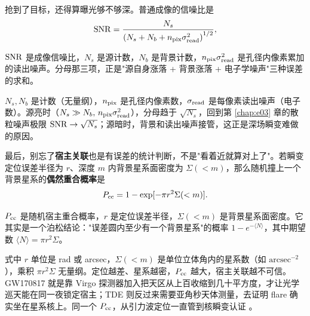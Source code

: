 抢到了目标，还得算曝光够不够深。普通成像的信噪比是
\begin{equation}
  {\rm SNR}=
  \frac{N_s}
  {\left(N_s+N_b+n_{\rm pix}\sigma_{\rm read}^2\right)^{1/2}},
  \label{eq:e20-imaging-snr}
\end{equation}
\begin{formulaexplain}
\({\rm SNR}\) 是成像信噪比，\(N_s\) 是源计数，\(N_b\) 是背景计数，\(n_{\rm pix}\sigma_{\rm read}^2\) 是孔径内像素累加的读出噪声。分母那三项，正是"源自身涨落 + 背景涨落 + 电子学噪声"三种误差的求和。
\end{formulaexplain}
\(N_s,N_b\) 是计数（无量纲），\(n_{\rm pix}\) 是孔径内像素数，\(\sigma_{\rm read}\) 是每像素读出噪声（电子数）。源亮时（\(N_s\gg N_b,\,n_{\rm pix}\sigma_{\rm read}^2\)），分母趋于 \(\sqrt{N_s}\)，回到第 \ref{chap:e03} 章的散粒噪声极限 \({\rm SNR}\to\sqrt{N_s}\)；源暗时，背景和读出噪声接管，这正是深场瞬变难做的原因。

最后，别忘了\textbf{宿主关联}也是有误差的统计判断，不是"看着近就算对上了"。若瞬变定位误差半径为 \(r\)、深度 \(m\) 内背景星系面密度为 \(\Sigma(<m)\)，那么随机撞上一个背景星系的\textbf{偶然重合概率}是
\begin{equation}
  P_{\rm cc}=1-\exp[-\pi r^2\Sigma(<m)].
  \label{eq:e20-chance-coincidence}
\end{equation}
\begin{formulaexplain}
\(P_{\rm cc}\) 是随机宿主重合概率，\(r\) 是定位误差半径，\(\Sigma(<m)\) 是背景星系面密度。它其实是一个泊松结论："误差圆内至少有一个背景星系"的概率 \(1-e^{-\langle N\rangle}\)，其中期望数 \(\langle N\rangle=\pi r^2\Sigma\)。
\end{formulaexplain}
式中 \(r\) 单位是 rad 或 arcsec，\(\Sigma(<m)\) 是单位立体角内的星系数（如 \(\mathrm{arcsec^{-2}}\)），乘积 \(\pi r^2\Sigma\) 无量纲。定位越差、星系越密，\(P_{\rm cc}\) 越大，宿主关联越不可信。GW170817 就是靠 Virgo 探测器加入把天区从上百收缩到几十平方度，才让光学巡天能在同一夜锁定宿主；TDE 则反过来需要亚角秒天体测量，去证明 flare 确实坐在星系核上。同一个 \(P_{\rm cc}\)，从引力波定位一直管到核瞬变认证 \citep{2017PhRvL.119p1101A,2017ApJ...848L..12A,2019ApJ...872..198V}。


